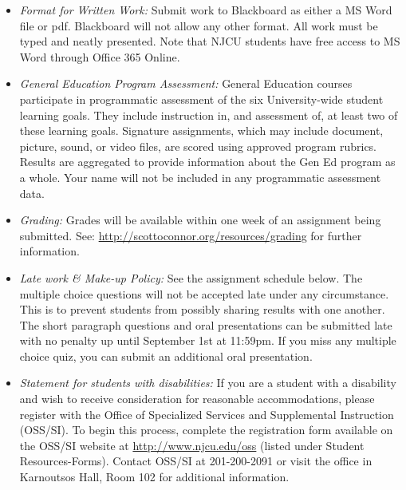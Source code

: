 \documentclass[article,oneside]{memoir}
\begin{document}
\begin{itemize}
\item \textit{Format for Written Work:} Submit work to Blackboard as either a MS Word file or pdf. Blackboard will not allow any other format. All work must be typed and neatly presented. Note that NJCU students have free access to MS Word through Office 365 Online.

\item \textit{General Education Program Assessment:} General Education courses participate in programmatic assessment of the six University-wide student learning goals. They include instruction in, and assessment of, at least two of these learning goals. Signature assignments, which may include document, picture, sound, or video files, are scored using approved program rubrics. Results are aggregated to provide information about the Gen Ed program as a whole. Your name will not be included in any programmatic assessment data.

\item \textit{Grading:} Grades will be available within one week of an assignment being submitted. See: \href{http://scottoconnor.org/resources/grading}{http://scottoconnor.org/resources/grading} for further information.


\item \textit{Late work \& Make-up Policy:} See the assignment schedule below. The multiple choice questions will not be accepted late under any circumstance. This is to prevent students from possibly sharing results with one another. The short paragraph questions and oral presentations can be submitted late with no penalty up until September 1st at 11:59pm.  If you miss any multiple choice quiz, you can submit an additional oral presentation. 

\item \textit{Statement for students with disabilities:} If you are a student with a disability and wish to receive consideration for reasonable accommodations, please register with the Office of Specialized Services and Supplemental Instruction (OSS/SI). To begin this process, complete the registration form available on the OSS/SI website at \href{http://www.njcu.edu/oss}{http://www.njcu.edu/oss} (listed under Student Resources-Forms). Contact OSS/SI at 201-200-2091 or visit the office in Karnoutsos Hall, Room 102 for additional information.



\end{itemize}
\end{document}
